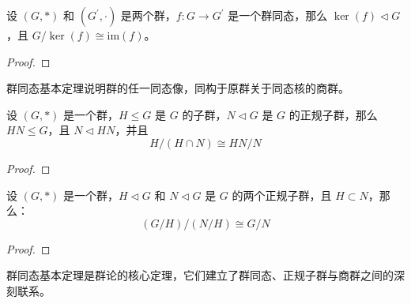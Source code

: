 \begin{theorem}
    设 $(G, *)$ 和 $(G^{\prime}, \cdot)$ 是两个群，$f:G\to G^{\prime}$ 是一个群同态，那么 $\ker(f) \triangleleft G$，且 $G/\ker(f) \cong \mathrm{im}(f)$。
    \label{thm:first_isomorphism_theorem}
\end{theorem}
\begin{proof}
    
\end{proof}

\begin{note}
    群同态基本定理说明群的任一同态像，同构于原群关于同态核的商群。
\end{note}

\vspace{1em}
\begin{theorem}
    设 $(G, *)$ 是一个群，$H \le G$ 是 $G$ 的子群，$N \triangleleft G$ 是 $G$ 的正规子群，那么 $HN \le G$，且 $N \triangleleft HN$，并且
    \[
        H/(H\cap N) \cong HN/N
    \]
    \label{thm:second_isomorphism_theorem}
\end{theorem}
\begin{proof}
\end{proof}
\vspace{1em}

\begin{theorem}
    设 $(G, *)$ 是一个群，$H \triangleleft G$ 和 $N \triangleleft G$ 是 $G$ 的两个正规子群，且 $H \subset N$，那么：
    \[
        (G/H)/(N/H) \cong G/N
    \]
    \label{thm:third_isomorphism_theorem}
\end{theorem}
\begin{proof}
\end{proof}
\vspace{1em}

\begin{note}
    群同态基本定理是群论的核心定理，它们建立了群同态、正规子群与商群之间的深刻联系。
\end{note}
\newpage